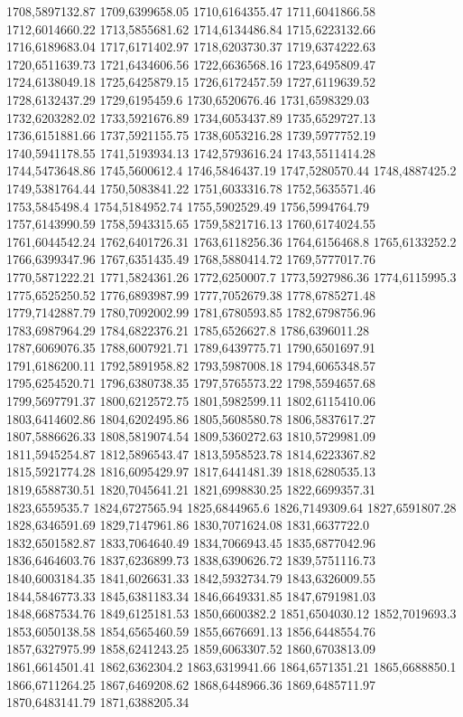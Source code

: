 1708,5897132.87
1709,6399658.05
1710,6164355.47
1711,6041866.58
1712,6014660.22
1713,5855681.62
1714,6134486.84
1715,6223132.66
1716,6189683.04
1717,6171402.97
1718,6203730.37
1719,6374222.63
1720,6511639.73
1721,6434606.56
1722,6636568.16
1723,6495809.47
1724,6138049.18
1725,6425879.15
1726,6172457.59
1727,6119639.52
1728,6132437.29
1729,6195459.6
1730,6520676.46
1731,6598329.03
1732,6203282.02
1733,5921676.89
1734,6053437.89
1735,6529727.13
1736,6151881.66
1737,5921155.75
1738,6053216.28
1739,5977752.19
1740,5941178.55
1741,5193934.13
1742,5793616.24
1743,5511414.28
1744,5473648.86
1745,5600612.4
1746,5846437.19
1747,5280570.44
1748,4887425.2
1749,5381764.44
1750,5083841.22
1751,6033316.78
1752,5635571.46
1753,5845498.4
1754,5184952.74
1755,5902529.49
1756,5994764.79
1757,6143990.59
1758,5943315.65
1759,5821716.13
1760,6174024.55
1761,6044542.24
1762,6401726.31
1763,6118256.36
1764,6156468.8
1765,6133252.2
1766,6399347.96
1767,6351435.49
1768,5880414.72
1769,5777017.76
1770,5871222.21
1771,5824361.26
1772,6250007.7
1773,5927986.36
1774,6115995.3
1775,6525250.52
1776,6893987.99
1777,7052679.38
1778,6785271.48
1779,7142887.79
1780,7092002.99
1781,6780593.85
1782,6798756.96
1783,6987964.29
1784,6822376.21
1785,6526627.8
1786,6396011.28
1787,6069076.35
1788,6007921.71
1789,6439775.71
1790,6501697.91
1791,6186200.11
1792,5891958.82
1793,5987008.18
1794,6065348.57
1795,6254520.71
1796,6380738.35
1797,5765573.22
1798,5594657.68
1799,5697791.37
1800,6212572.75
1801,5982599.11
1802,6115410.06
1803,6414602.86
1804,6202495.86
1805,5608580.78
1806,5837617.27
1807,5886626.33
1808,5819074.54
1809,5360272.63
1810,5729981.09
1811,5945254.87
1812,5896543.47
1813,5958523.78
1814,6223367.82
1815,5921774.28
1816,6095429.97
1817,6441481.39
1818,6280535.13
1819,6588730.51
1820,7045641.21
1821,6998830.25
1822,6699357.31
1823,6559535.7
1824,6727565.94
1825,6844965.6
1826,7149309.64
1827,6591807.28
1828,6346591.69
1829,7147961.86
1830,7071624.08
1831,6637722.0
1832,6501582.87
1833,7064640.49
1834,7066943.45
1835,6877042.96
1836,6464603.76
1837,6236899.73
1838,6390626.72
1839,5751116.73
1840,6003184.35
1841,6026631.33
1842,5932734.79
1843,6326009.55
1844,5846773.33
1845,6381183.34
1846,6649331.85
1847,6791981.03
1848,6687534.76
1849,6125181.53
1850,6600382.2
1851,6504030.12
1852,7019693.3
1853,6050138.58
1854,6565460.59
1855,6676691.13
1856,6448554.76
1857,6327975.99
1858,6241243.25
1859,6063307.52
1860,6703813.09
1861,6614501.41
1862,6362304.2
1863,6319941.66
1864,6571351.21
1865,6688850.1
1866,6711264.25
1867,6469208.62
1868,6448966.36
1869,6485711.97
1870,6483141.79
1871,6388205.34
